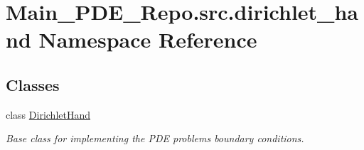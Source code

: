 \hypertarget{namespaceMain__PDE__Repo_1_1src_1_1dirichlet__hand}{}\section{Main\+\_\+\+P\+D\+E\+\_\+\+Repo.\+src.\+dirichlet\+\_\+hand Namespace Reference}
\label{namespaceMain__PDE__Repo_1_1src_1_1dirichlet__hand}
\subsection*{Classes}
\begin{DoxyCompactItemize}
\item 
class \hyperlink{classMain__PDE__Repo_1_1src_1_1dirichlet__hand_1_1DirichletHand}{Dirichlet\+Hand}
\begin{DoxyCompactList}\small\item\em Base class for implementing the P\+DE problem\textquotesingle{}s boundary conditions. \end{DoxyCompactList}\end{DoxyCompactItemize}
